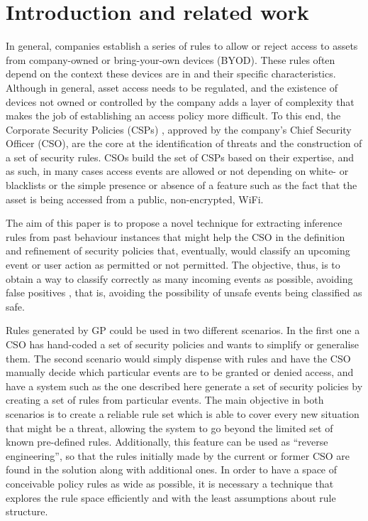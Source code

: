 \documentclass[runningheads]{llncs}
\begin{document}
\section{Introduction and related work}
\label{sec:intro}


In general, companies establish a series of rules to allow or reject
access to assets from company-owned or bring-your-own devices (BYOD). These rules often depend on the context these devices are in and their specific
characteristics. Although in general, asset access needs to be
regulated, and the existence of devices not owned or controlled by the company
adds a layer of complexity that makes the job of establishing an
access policy more difficult.
To this end, the Corporate Security Policies (CSPs)
\cite{Kaeo:2003:DNS:1201807}, approved by the company's Chief Security
Officer (CSO), are the core at the identification of threats and the
construction of a set of security rules. CSOs build the
set of CSPs based on their expertise, and as such, in many cases
access events are allowed or not depending on white- or blacklists or
the simple presence or absence of a feature such as the fact that the
asset is being accessed from a public, non-encrypted, WiFi.

The aim of this paper is to propose a novel technique for extracting
inference rules from past behaviour instances 
that might help the CSO in the definition and refinement
of security policies that, eventually, would classify an upcoming
event or user action as permitted or not permitted.
The objective, thus, is to obtain a way to classify correctly as many
incoming events as possible, avoiding false positives
\cite{pietraszek2005data}, that is, avoiding the possibility of unsafe
events being classified as safe.

Rules generated by GP could be used
in two different scenarios. In the first one a CSO has hand-coded a set of security
policies and wants to simplify or generalise them. The second scenario 
would simply dispense with rules and have the CSO manually decide which
particular events are to be granted or denied access, and have a system such
as the one described here generate a set of security policies
by creating a set of rules from particular events. 
The main objective in both scenarios is to create a reliable rule set
which is able to cover every new situation that might be a threat,
allowing the system to go beyond the limited set of known pre-defined
rules. Additionally, this feature can be used as ``reverse
engineering'', so that the rules initially made by the current or
former CSO are found in the solution along with additional ones. In
order to have a space of conceivable policy rules as wide 
as possible, it is necessary a technique that explores the rule space
efficiently and with the least assumptions about rule structure.
\end{document}
